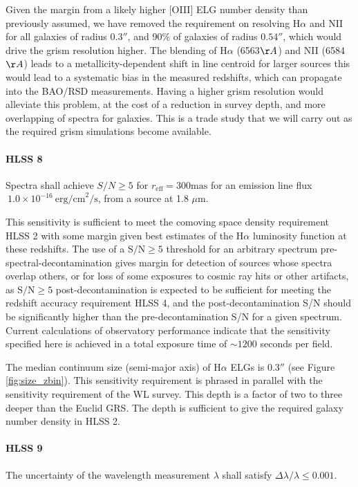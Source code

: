 Given the margin from a likely higher [OIII] ELG number density than previously
 assumed, we have removed the requirement on resolving H$\alpha$ and NII for all
 galaxies of radius $0.3''$, and 90\% of galaxies of radius $0.54''$, which would drive
 the grism resolution higher. The blending of H$\alpha$ (6563$\AA$) and NII (6584$\AA$) leads to
 a metallicity-dependent shift in line centroid for larger sources
 this would lead to a systematic bias in the measured redshifts, which can
 propagate into the BAO/RSD measurements. Having a higher grism resolution would
 alleviate this problem, at the cost of a reduction in survey depth, and more
 overlapping of spectra for galaxies. This is a trade study that we will carry out
 as the required grism simulations become available.

 \paragraph{HLSS 8} Spectra shall achieve $S/N \geq 5$ for $r_\mathrm{eff} = 300
 \mathrm{mas}$ for an emission line flux $~ 1.0\times10^{-16}\ \mathrm{erg/cm}^2\mathrm{/s}$, from a source at 1.8 $\mu$m.

 This sensitivity is sufficient to meet the comoving space density requirement
 HLSS 2 with some margin given best estimates of the H$\alpha$ luminosity function
 \citep{Pozzetti:2016} at these redshifts. The use of a $\mathrm{S/N} \geq 5$ threshold for an arbitrary spectrum pre-spectral-decontamination gives margin for detection of sources whose spectra overlap others, or for loss of some exposures to cosmic ray hits or other artifacts, as $\mathrm{S/N} \geq 5$ post-decontamination is expected to be
 sufficient for meeting the redshift accuracy requirement HLSS 4, and the
 post-decontamination S/N should be significantly higher than the
 pre-decontamination S/N for a given spectrum. Current calculations of
 observatory performance indicate that the sensitivity specified here is achieved
 in a total exposure time of  $\sim1200$ seconds per field.

 The median continuum size (semi-major axis) of H$\alpha$ ELGs is $0.3''$ (see Figure \ref{fig:size_zbin}).
 This sensitivity requirement is phrased in parallel with the sensitivity requirement
 of the WL survey. This depth is a factor of two to three deeper than the Euclid
 GRS. The depth is sufficient to give the required galaxy number density in HLSS 2.

\paragraph{HLSS 9} The uncertainty of the wavelength measurement $\lambda$ shall satisfy $\Delta\lambda/\lambda \leq 0.001$.

